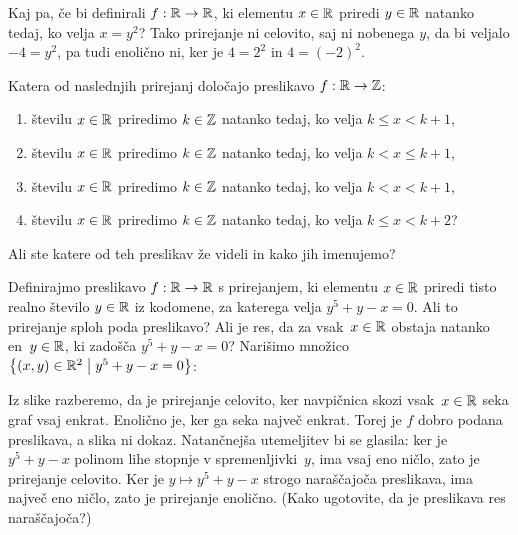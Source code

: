 \begin{zgled}
  Kaj pa, če bi definirali $f : \mathbb{R} \to \mathbb{R}$, ki elementu $x \in \mathbb{R}$ priredi $y \in \mathbb{R}$ natanko tedaj,
  ko velja $x = y^2$? Tako prirejanje ni celovito, saj ni nobenega $y$, da bi veljalo $-4 = y^2$, pa tudi enolično ni,
  ker je $4 = 2^2$ in $4 = (-2)^2$.
\end{zgled}

\begin{vaja}
  Katera od naslednjih prirejanj določajo preslikavo $f : \mathbb{R} \to \mathbb{Z}$:
  \begin{enumerate}
  \item številu $x \in \mathbb{R}$ priredimo $k \in \mathbb{Z}$ natanko tedaj, ko velja $k \leq x < k + 1$,
  \item številu $x \in \mathbb{R}$ priredimo $k \in \mathbb{Z}$ natanko tedaj, ko velja $k < x \leq k + 1$,
  \item številu $x \in \mathbb{R}$ priredimo $k \in \mathbb{Z}$ natanko tedaj, ko velja $k < x < k + 1$,
  \item številu $x \in \mathbb{R}$ priredimo $k \in \mathbb{Z}$ natanko tedaj, ko velja $k \leq x < k + 2$?
  \end{enumerate}
  Ali ste katere od teh preslikav že videli in kako jih imenujemo?
\end{vaja}

\begin{zgled}
  \label{zgled:prirejanje-opis}
  Definirajmo preslikavo $f : \mathbb{R} \to \mathbb{R}$ s prirejanjem, ki elementu $x \in \mathbb{R}$ priredi tisto realno število $y \in \mathbb{R}$ iz kodomene, za katerega velja $y^5 + y - x = 0$.
  Ali to prirejanje sploh poda preslikavo? Ali je res, da za vsak~$x \in \mathbb{R}$ obstaja natanko en~$y \in \mathbb{R}$, ki zadošča $y^5 + y - x = 0$?
  Narišimo množico $\left\{(x,y) \in \mathbb{R}^2 \; \middle| \; y^5 + y - x = 0\right\}$:
  \begin{center}
  \end{center}
  Iz slike razberemo, da je prirejanje celovito, ker navpičnica skozi vsak~$x \in \mathbb{R}$ seka graf vsaj enkrat.
  Enolično je, ker ga seka največ enkrat.
  Torej je $f$ dobro podana preslikava, a slika ni dokaz.
  Natančnejša utemeljitev bi se glasila: ker je $y^5 + y - x$ polinom lihe stopnje v spremenljivki~$y$, ima vsaj eno ničlo, zato je prirejanje celovito. Ker je $y \mapsto y^5 + y - x$ strogo naraščajoča preslikava, ima največ eno ničlo, zato je prirejanje enolično. (Kako ugotovite, da je preslikava res naraščajoča?)
\end{zgled}

